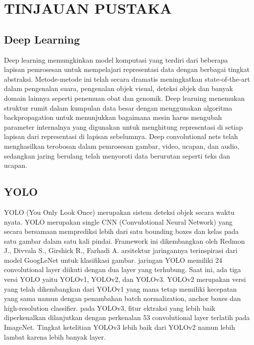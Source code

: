 \section{TINJAUAN PUSTAKA}

\subsection{Deep Learning}


Deep learning memungkinkan model komputasi yang terdiri dari beberapa lapisan pemrosesan untuk mempelajari representasi data dengan berbagai tingkat abstraksi. Metode-metode ini telah secara dramatis meningkatkan state-of-the-art dalam pengenalan suara, pengenalan objek visual, deteksi objek dan banyak domain lainnya seperti penemuan obat dan genomik. Deep learning menemukan struktur rumit dalam kumpulan data besar dengan menggunakan algoritma backpropagation untuk menunjukkan bagaimana mesin harus mengubah parameter internalnya yang digunakan untuk menghitung representasi di setiap lapisan dari representasi di lapisan sebelumnya. Deep convolutional nets telah menghasilkan terobosan dalam pemrosesan gambar, video, ucapan, dan audio, sedangkan jaring berulang telah menyoroti data berurutan seperti teks dan ucapan.  \citep{article}

\subsection{YOLO}
YOLO (You Only Look Once) merupakan sistem deteksi objek secara waktu nyata. YOLO merupakan single CNN (Convulotional Neural Network) yang secara bersamaan memprediksi lebih dari satu bounding boxes dan kelas pada satu gambar dalam satu kali pindai. Framework ini dikembangkan oleh Redmon J., Divvala S., Girshick R., Farhadi A. arsitektur jaringannya terinspirasi dari model GoogLeNet untuk klasifikasi gambar. jaringan YOLO memiliki 24 convolutional layer diikuti dengan dua layer yang terhubung.
Saat ini, ada tiga versi YOLO yaitu YOLOv1, YOLOv2, dan YOLOv3. YOLOv2 merupakan versi yang telah dikembangkan dari YOLOv1 yang mana tetap memiliki kecepatan yang sama namun dengan penambahan batch normalization, anchor boxes dan high-resolution classifier. pada YOLOv3, fitur ektraksi yang lebih baik diperkenalkan dilanjutkan dengan perkenalan 53 convolutional layer terlatih pada ImageNet. Tingkat ketelitian YOLOv3 lebih baik dari YOLOv2 namun lebih lambat karena lebih banyak layer. \citep{Redmon_2016_CVPR}

